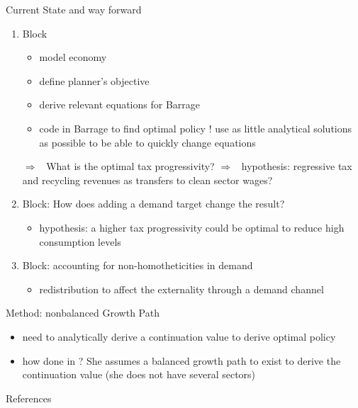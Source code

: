 \documentclass[11pt,aspectratio=169]{beamer}
\newcommand{\ar}{$\Rightarrow$ \ }
\begin{document}
\begin{frame}{Current State and way forward}
	\begin{enumerate}
		\item Block
		\begin{itemize}
			\item model economy \checkmark
			\item define planner's objective
			\item derive relevant equations for Barrage
			\item code in Barrage to find optimal policy ! use as little analytical solutions as possible to be able to quickly change equations
		\end{itemize}
		\ar What is the optimal tax progressivity? \ar hypothesis: regressive tax and recycling revenues as transfers to clean sector wages?
		\item Block: How does adding a demand target change the result?
		\begin{itemize}
			\item hypothesis: a higher tax progressivity could be optimal to reduce high consumption levels
		\end{itemize}
	\item Block: accounting for non-homotheticities in demand
	\begin{itemize}
		\item redistribution to affect the externality through a demand channel
	\end{itemize}
	\end{enumerate}
\end{frame}

\begin{frame}{Method: nonbalanced Growth Path}
	\begin{itemize}
		\item need to analytically derive a continuation value to derive optimal policy
		\item how done in \cite{Barrage2019OptimalPolicy}? She assumes a balanced growth path to exist to derive the continuation value (she does not have several sectors)
	\end{itemize}
\end{frame}


\begin{frame}[shrink]{References}
	
	
	
\end{frame}
\end{document}
